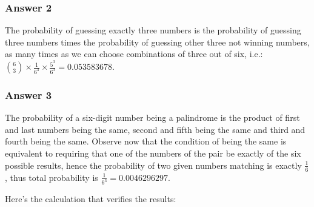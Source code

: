 \documentclass[11pt]{article}
\begin{document}
\subsubsection{Answer 2}
\label{sec-1-1-2}
The probability of guessing exactly three numbers is the probability
of guessing three numbers times the probability of guessing other three
not winning numbers, as many times as we can choose combinations of three
out of six, i.e.:
$\binom{6}{3} \times \frac{1}{6^3} \times \frac{5^3}{6^3} = 0.053583678$.
\subsubsection{Answer 3}
\label{sec-1-1-3}
The probability of a six-digit number being a palindrome is the product
of first and last numbers being the same, second and fifth being the same
and third and fourth being the same.  Observe now that the condition of
being the same is equivalent to requiring that one of the numbers of the
pair be exactly of the six possible results, hence the probability of
two given numbers matching is exactly $\frac{1}{6}$, thus total probability
is $\frac{1}{6^3} = 0.0046296297$.

Here's the calculation that verifies the results:
\end{document}
